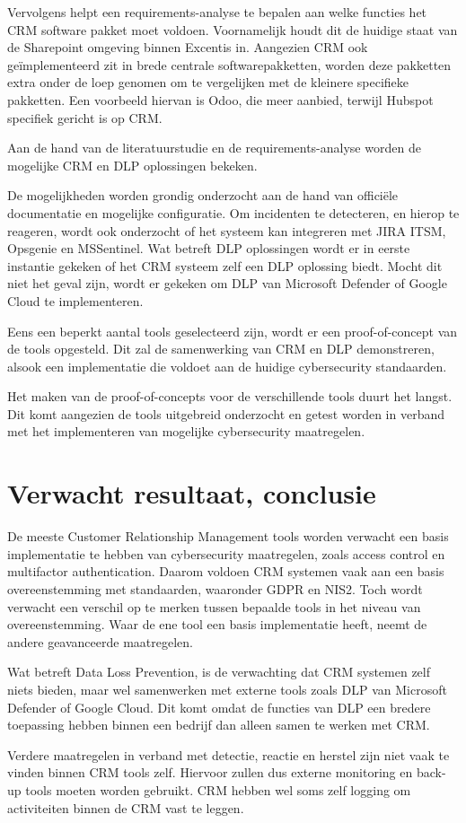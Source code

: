Vervolgens helpt een requirements-analyse te bepalen aan welke functies het CRM software pakket moet voldoen. Voornamelijk houdt dit de huidige staat van de Sharepoint omgeving binnen Excentis in. Aangezien CRM ook geïmplementeerd zit in brede centrale softwarepakketten, worden deze pakketten extra onder de loep genomen om te vergelijken met de kleinere specifieke pakketten. Een voorbeeld hiervan is Odoo, die meer aanbied, terwijl Hubspot specifiek gericht is op CRM.

Aan de hand van de literatuurstudie en de requirements-analyse worden de mogelijke CRM en DLP oplossingen bekeken. \newline

De mogelijkheden worden grondig onderzocht aan de hand van officiële documentatie en mogelijke configuratie. Om incidenten te detecteren, en hierop te reageren, wordt ook onderzocht of het systeem kan integreren met JIRA ITSM, Opsgenie en MSSentinel. Wat betreft DLP oplossingen wordt er in eerste instantie gekeken of het CRM systeem zelf een DLP oplossing biedt. Mocht dit niet het geval zijn, wordt er gekeken om DLP van Microsoft Defender of Google Cloud te implementeren.

Eens een beperkt aantal tools geselecteerd zijn, wordt er een proof-of-concept van de tools opgesteld. Dit zal de samenwerking van CRM en DLP demonstreren, alsook een implementatie die voldoet aan de huidige cybersecurity standaarden. \newline

Het maken van de proof-of-concepts voor de verschillende tools duurt het langst. Dit komt aangezien de tools uitgebreid onderzocht en getest worden in verband met het implementeren van mogelijke cybersecurity maatregelen.


\section{Verwacht resultaat, conclusie}%
\label{sec:verwachte_resultaten}

De meeste Customer Relationship Management tools worden verwacht een basis implementatie te hebben van cybersecurity maatregelen, zoals access control en multifactor authentication. Daarom voldoen CRM systemen vaak aan een basis overeenstemming met standaarden, waaronder GDPR en NIS2. Toch wordt verwacht een verschil op te merken tussen bepaalde tools in het niveau van overeenstemming. Waar de ene tool een basis implementatie heeft, neemt de andere geavanceerde maatregelen.

Wat betreft Data Loss Prevention, is de verwachting dat CRM systemen zelf niets bieden, maar wel samenwerken met externe tools zoals DLP van Microsoft Defender of Google Cloud. Dit komt omdat de functies van DLP een bredere toepassing hebben binnen een bedrijf dan alleen samen te werken met CRM.

Verdere maatregelen in verband met detectie, reactie en herstel zijn niet vaak te vinden binnen CRM tools zelf. Hiervoor zullen dus externe monitoring en back-up tools moeten worden gebruikt. CRM hebben wel soms zelf logging om activiteiten binnen de CRM vast te leggen.



